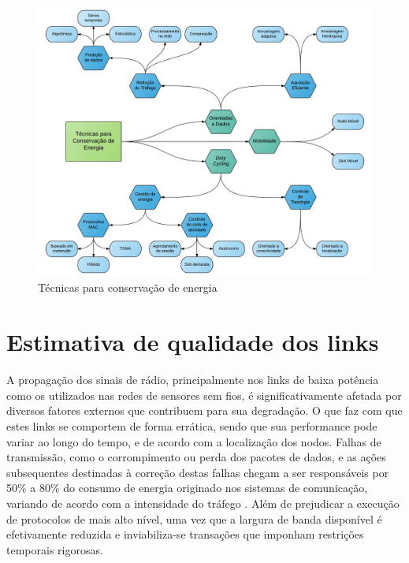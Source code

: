 \documentclass[
	12pt,				%
	openright,			%
	oneside,
	a4paper,			%
	english,			%
	french,				%
	spanish,			%
	brazil				%
	]{abntex2}
\begin{document}
\begin{figure}[htb]
	\caption{\label{fig_power_optimization_category}Técnicas para conservação de energia}
	\begin{center}
		\includegraphics[width=\linewidth]{EnergyConservation}
	\end{center}
\end{figure}


\section{Estimativa de qualidade  dos links}

A propagação dos sinais de rádio, principalmente nos links de baixa potência como os utilizados nas redes de sensores sem fios, é significativamente afetada por diversos fatores externos que contribuem para sua degradação. O que faz com que estes links se comportem de forma errática, sendo que sua performance pode variar ao longo do tempo, e de acordo com a localização dos nodos. Falhas de transmissão, como o corrompimento ou perda dos pacotes de dados, e as ações subsequentes destinadas à correção destas falhas chegam a ser responsáveis por 50\% a 80\% do consumo de energia originado nos sistemas de comunicação, variando de acordo com a intensidade do tráfego \cite{Srinivasan2006}. Além de prejudicar a execução de protocolos de mais alto nível, uma vez que a largura de banda disponível é efetivamente reduzida e inviabiliza-se transações que imponham restrições temporais rigorosas.
\end{document}
